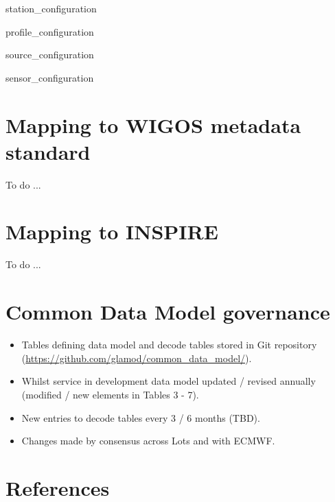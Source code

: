 \documentclass[a4paper]{article}
\begin{document}
 {station_configuration}


 {profile_configuration}


 {source_configuration}


 {sensor_configuration}

\section {Mapping to WIGOS metadata standard}
To do ...
\section {Mapping to INSPIRE}
To do ...
\section {Common Data Model governance}
\begin{itemize}
\item Tables defining data model and decode tables stored in Git repository (\url{https://github.com/glamod/common_data_model/}).
\item Whilst service in development data model updated / revised annually (modified / new elements in Tables 3 - 7).
\item New entries to decode tables every 3 / 6 months (TBD).
\item Changes made by consensus across Lots and with ECMWF.
\end{itemize}

\section {References}
\end{document}
